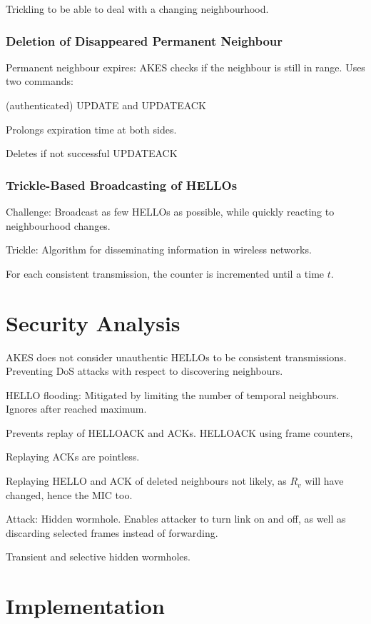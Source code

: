 \documentclass[10pt]{article}
\begin{document}
Trickling to be able to deal with a changing neighbourhood.

\subsubsection{Deletion of Disappeared Permanent Neighbour}

Permanent neighbour expires: AKES checks if the neighbour is still in range. Uses two commands:

(authenticated) UPDATE and UPDATEACK

Prolongs expiration time at both sides.

Deletes if not successful UPDATEACK

\subsubsection{Trickle-Based Broadcasting of HELLOs}

Challenge: Broadcast as few HELLOs as possible, while quickly reacting to neighbourhood changes.

Trickle: Algorithm for disseminating information in wireless networks.

For each consistent transmission, the counter is incremented until a time $t$. 


\section{Security Analysis}

AKES does not consider unauthentic HELLOs to be consistent transmissions. Preventing DoS attacks with respect to discovering neighbours.

HELLO flooding: Mitigated by limiting the number of temporal neighbours. Ignores after reached maximum.

Prevents replay of HELLOACK and ACKs. HELLOACK using frame counters, 

Replaying ACKs are pointless.

Replaying HELLO and ACK of deleted neighbours not likely, as $R_v$ will have changed, hence the MIC too.

Attack: Hidden wormhole. Enables attacker to turn link on and off, as well as discarding selected frames instead of forwarding.

Transient and selective hidden wormholes.

\section{Implementation}
\end{document}
